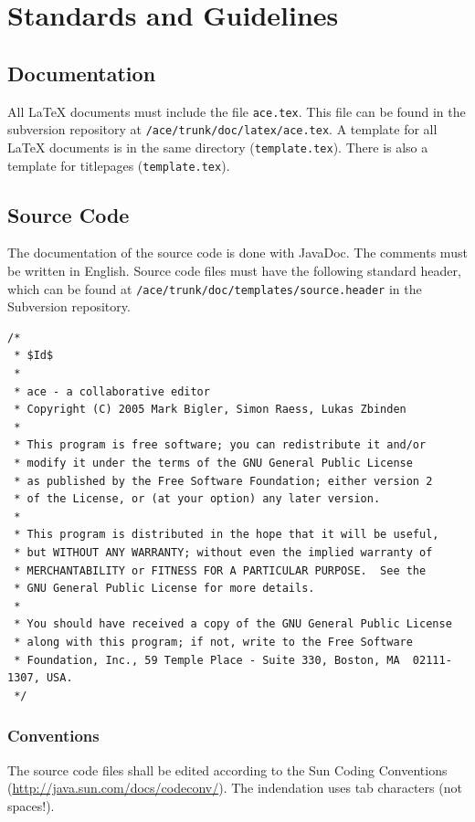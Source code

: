 \documentclass[11pt,a4paper]{article}
\begin{document}
\section{Standards and Guidelines}

\subsection{Documentation}
All \LaTeX{} documents must include the file \texttt{ace.tex}. This file can be found in the subversion repository at \texttt{/ace/trunk/doc/latex/ace.tex}.
A template for all \LaTeX{} documents is in the same directory (\texttt{template.tex}). There is also a template for titlepages (\texttt{template.tex}).

\subsection{Source Code}
The documentation of the source code is done with JavaDoc. The comments must be written in English. Source code files must have the following standard header,
which can be found at \texttt{/ace/trunk/doc/templates/source.header} in the Subversion repository.

\small{
\begin{verbatim}
/*
 * $Id$
 *
 * ace - a collaborative editor
 * Copyright (C) 2005 Mark Bigler, Simon Raess, Lukas Zbinden
 *
 * This program is free software; you can redistribute it and/or
 * modify it under the terms of the GNU General Public License
 * as published by the Free Software Foundation; either version 2
 * of the License, or (at your option) any later version.
 *
 * This program is distributed in the hope that it will be useful,
 * but WITHOUT ANY WARRANTY; without even the implied warranty of
 * MERCHANTABILITY or FITNESS FOR A PARTICULAR PURPOSE.  See the
 * GNU General Public License for more details.
 *
 * You should have received a copy of the GNU General Public License
 * along with this program; if not, write to the Free Software
 * Foundation, Inc., 59 Temple Place - Suite 330, Boston, MA  02111-1307, USA.
 */
\end{verbatim}
}

\subsubsection*{Conventions}

The source code files shall be edited according to the Sun Coding Conventions (\href{http://java.sun.com/docs/codeconv/}{http://java.sun.com/docs/codeconv/}).
The indendation uses tab characters (not spaces!).
\end{document}
